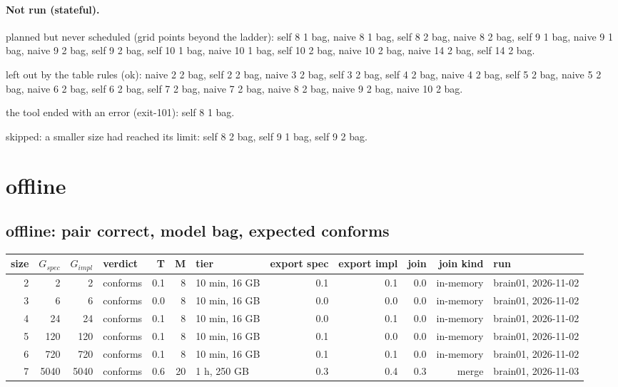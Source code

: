 \documentclass[10pt]{article}
\begin{document}
\paragraph{Not run (stateful).}
planned but never scheduled (grid points beyond the ladder): self 8 1 bag, naive 8 1 bag, self 8 2 bag, naive 8 2 bag, self 9 1 bag, naive 9 1 bag, naive 9 2 bag, self 9 2 bag, self 10 1 bag, naive 10 1 bag, self 10 2 bag, naive 10 2 bag, naive 14 2 bag, self 14 2 bag.\par
left out by the table rules (ok): naive 2 2 bag, self 2 2 bag, naive 3 2 bag, self 3 2 bag, self 4 2 bag, naive 4 2 bag, self 5 2 bag, naive 5 2 bag, naive 6 2 bag, self 6 2 bag, self 7 2 bag, naive 7 2 bag, naive 8 2 bag, naive 9 2 bag, naive 10 2 bag.\par
the tool ended with an error (exit-101): self 8 1 bag.\par
skipped: a smaller size had reached its limit: self 8 2 bag, self 9 1 bag, self 9 2 bag.\par
\section*{offline}
\subsection*{offline: pair \textsf{correct}, model bag, expected conforms}
\begin{longtable}{@{}rrrlrrlrrrrl@{}}
\toprule
size & $G_{\mathit{spec}}$ & $G_{\mathit{impl}}$ & verdict & T & M & tier & export spec & export impl & join & join kind & run \\
\midrule
\endhead
\color{red} 2 & 2 & 2 & conforms & 0.1 & 8 & 10 min, 16 GB & 0.1 & 0.1 & 0.0 & in-memory & brain01, 2026-11-02 \\
\color{red} 3 & 6 & 6 & conforms & 0.0 & 8 & 10 min, 16 GB & 0.0 & 0.0 & 0.0 & in-memory & brain01, 2026-11-02 \\
\color{red} 4 & 24 & 24 & conforms & 0.1 & 8 & 10 min, 16 GB & 0.0 & 0.1 & 0.0 & in-memory & brain01, 2026-11-02 \\
\color{red} 5 & 120 & 120 & conforms & 0.1 & 8 & 10 min, 16 GB & 0.1 & 0.0 & 0.0 & in-memory & brain01, 2026-11-02 \\
\color{red} 6 & 720 & 720 & conforms & 0.1 & 8 & 10 min, 16 GB & 0.1 & 0.1 & 0.0 & in-memory & brain01, 2026-11-02 \\
\color{blue} 7 & 5040 & 5040 & conforms & 0.6 & 20 & 1 h, 250 GB & 0.3 & 0.4 & 0.3 & merge & brain01, 2026-11-03 \\
\bottomrule
\end{longtable}
\end{document}
